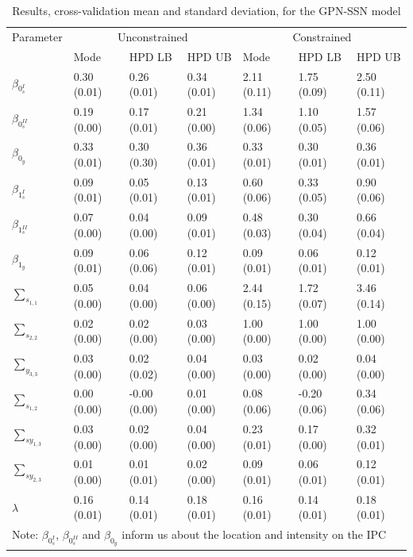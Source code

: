 \documentclass[man,mask]{apa6}
\begin{document}
\begin{table}
\caption{\label{tab:estCLGPNM}Results, cross-validation mean and standard deviation, for the GPN-SSN model}
\centering
\begin{tabular}[t]{lllllll}
\toprule
\multicolumn{1}{c}{Parameter} & \multicolumn{3}{c}{Unconstrained} & \multicolumn{3}{c}{Constrained} \\
\cmidrule(l{2pt}r{2pt}){1-1} \cmidrule(l{2pt}r{2pt}){2-4} \cmidrule(l{2pt}r{2pt}){5-7}
  & Mode & HPD LB & HPD UB & Mode & HPD LB & HPD UB\\
\midrule
$\beta_{0_s^{I}}$ & 0.30 (0.01) & 0.26 (0.01) & 0.34 (0.01) & 2.11 (0.11) & 1.75 (0.09) & 2.50 (0.11)\\
$\beta_{0_s^{II}}$ & 0.19 (0.00) & 0.17 (0.01) & 0.21 (0.00) & 1.34 (0.06) & 1.10 (0.05) & 1.57 (0.06)\\
$\beta_{0_y}$ & 0.33 (0.01) & 0.30 (0.30) & 0.36 (0.01) & 0.33 (0.01) & 0.30 (0.01) & 0.36 (0.01)\\
\addlinespace
$\beta_{1_s^{I}}$ & 0.09 (0.01) & 0.05 (0.01) & 0.13 (0.01) & 0.60 (0.06) & 0.33 (0.05) & 0.90 (0.06)\\
$\beta_{1_s^{II}}$ & 0.07 (0.00) & 0.04 (0.00) & 0.09 (0.01) & 0.48 (0.03) & 0.30 (0.04) & 0.66 (0.04)\\
$\beta_{1_y}$ & 0.09 (0.01) & 0.06 (0.06) & 0.12 (0.01) & 0.09 (0.01) & 0.06 (0.01) & 0.12 (0.01)\\
\addlinespace
$\sum_{s_{1,1}}$ & 0.05 (0.00) & 0.04 (0.00) & 0.06 (0.00) & 2.44 (0.15) & 1.72 (0.07) & 3.46 (0.14)\\
$\sum_{s_{2,2}}$ & 0.02 (0.00) & 0.02 (0.00) & 0.03 (0.00) & 1.00 (0.00) & 1.00 (0.00) & 1.00 (0.00)\\
$\sum_{y_{3,3}}$ & 0.03 (0.00) & 0.02 (0.02) & 0.04 (0.00) & 0.03 (0.00) & 0.02 (0.00) & 0.04 (0.00)\\
$\sum_{s_{1,2}}$ & 0.00 (0.00) & -0.00 (0.00) & 0.01 (0.00) & 0.08 (0.06) & -0.20 (0.06) & 0.34 (0.06)\\
$\sum_{sy_{1,3}}$ & 0.03 (0.00) & 0.02 (0.00) & 0.04 (0.00) & 0.23 (0.01) & 0.17 (0.00) & 0.32 (0.01)\\
$\sum_{sy_{2,3}}$ & 0.01 (0.00) & 0.01 (0.01) & 0.02 (0.00) & 0.09 (0.01) & 0.06 (0.01) & 0.12 (0.01)\\
$\lambda$ & 0.16 (0.01) & 0.14 (0.01) & 0.18 (0.01) & 0.16 (0.01) & 0.14 (0.01) & 0.18 (0.01)\\
\bottomrule
\multicolumn{7}{l}{Note: $\beta_{0_s^{I}}$, $\beta_{0_s^{II}}$ and $\beta_{0_y}$ inform us about the location and intensity on the IPC}\\

\end{tabular}
\end{table}
\end{document}
